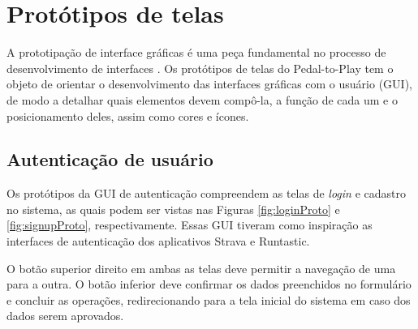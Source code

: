 \section{Protótipos de telas}
A prototipação de interface gráficas é uma peça fundamental no processo de desenvolvimento de interfaces \cite{sommerville2003engenharia}. Os protótipos de telas do Pedal-to-Play tem o objeto de orientar o desenvolvimento das interfaces gráficas com o usuário (GUI), de modo a detalhar quais elementos devem compô-la, a função de cada um e o posicionamento deles, assim como cores e ícones.  

\subsection{Autenticação de usuário}
Os protótipos da GUI de autenticação compreendem as telas de \textit{login} e cadastro no sistema, as quais podem ser vistas nas Figuras \ref{fig:loginProto} e \ref{fig:signupProto}, respectivamente. Essas GUI tiveram como inspiração as interfaces de autenticação dos aplicativos Strava e Runtastic. 
\par
O botão superior direito em ambas as telas deve permitir a navegação de uma para a outra. O botão inferior deve confirmar os dados preenchidos no formulário e concluir as operações, redirecionando para a tela inicial do sistema em caso dos dados serem aprovados.

